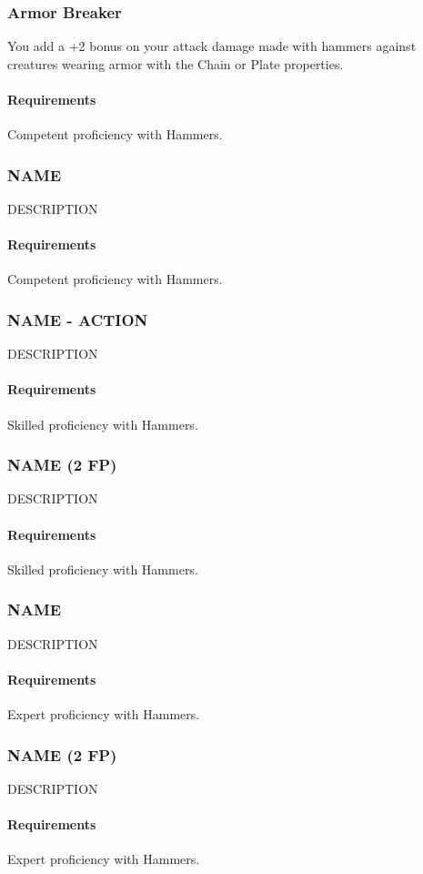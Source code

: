 \subsubsection{Armor Breaker} \label{feat::armorbreaker}
    You add a +2 bonus on your attack damage made with hammers against creatures wearing armor with the Chain or Plate properties.
    \paragraph{Requirements} Competent proficiency with Hammers.
\subsubsection{NAME} \label{feat::name}
    DESCRIPTION
    \paragraph{Requirements} Competent proficiency with Hammers.
\subsubsection{NAME - ACTION} \label{feat::name}
    DESCRIPTION
    \paragraph{Requirements} Skilled proficiency with Hammers.
\subsubsection{NAME (2 FP)} \label{feat::name}
    DESCRIPTION
    \paragraph{Requirements} Skilled proficiency with Hammers.
\subsubsection{NAME} \label{feat::name}
    DESCRIPTION
    \paragraph{Requirements} Expert proficiency with Hammers.
\subsubsection{NAME (2 FP)} \label{feat::name}
    DESCRIPTION
    \paragraph{Requirements} Expert proficiency with Hammers.
